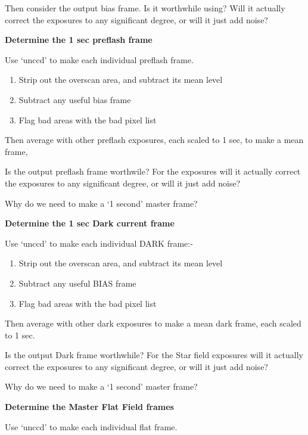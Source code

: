 \begin{small}
{{ Then consider the output bias frame. Is it worthwhile using? Will
 it actually correct the exposures to any significant degree, or
 will it just add noise?



{\hspace*{4ex} \bf   Determine the 1 sec preflash frame}

 Use `unccd' to make each individual preflash frame.

\begin{enumerate}
\item Strip out the overscan area, and subtract its mean level
\item Subtract any useful bias frame
\item Flag bad areas with the bad pixel list
\end{enumerate}

 Then average with other preflash exposures, each  scaled to 1 sec,
 to make a mean frame,

 Is the output preflash frame worthwile? For the exposures will
 it actually correct the exposures to any significant degree, or
 will it just add noise?

 Why do we need to make a `1 second' master frame?

{\hspace*{4ex} \bf  Determine the 1 sec Dark current frame}

 Use `unccd' to make each individual DARK frame:-

\begin{enumerate}
\item Strip out the overscan area, and subtract its mean level
\item Subtract any useful BIAS frame
\item Flag bad areas with the bad pixel list
\end{enumerate}

 Then average with other dark exposures to make a mean dark frame,
 each scaled to 1 sec.

 Is the output Dark frame worthwhile? For the Star field exposures will
 it actually correct the exposures to any significant degree, or
 will it just add noise?

 Why do we need to make a `1 second' master frame?


{\hspace*{4ex} \bf  Determine the Master Flat Field frames}

 Use `unccd' to make each individual flat frame.

}}
\end{small}
